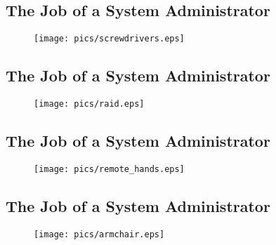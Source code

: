 \documentclass[xga]{xdvislides}
\begin{document}
\subsection{The Job of a System Administrator}
\vspace*{\fill}
\begin{figure}[hb]
	\begin{center}
		\texttt{[image: pics/screwdrivers.eps]} \\
	\end{center}
\end{figure}
\vspace*{\fill}

\subsection{The Job of a System Administrator}
\vspace*{\fill}
\begin{figure}[hb]
	\begin{center}
		\texttt{[image: pics/raid.eps]} \\
	\end{center}
\end{figure}
\vspace*{\fill}

\subsection{The Job of a System Administrator}
\vspace*{\fill}
\begin{figure}[hb]
	\begin{center}
		\texttt{[image: pics/remote\_hands.eps]} \\
	\end{center}
\end{figure}
\vspace*{\fill}

\subsection{The Job of a System Administrator}
\vspace*{\fill}
\begin{figure}[hb]
	\begin{center}
		\texttt{[image: pics/armchair.eps]} \\
	\end{center}
\end{figure}
\vspace*{\fill}
\end{document}
